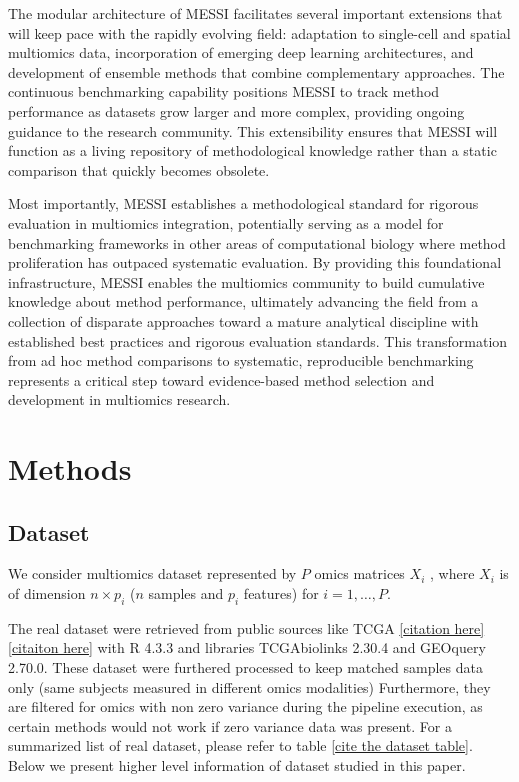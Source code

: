 \documentclass[
]{article}
\begin{document}
The modular architecture of MESSI facilitates several important extensions that will keep pace with the rapidly evolving field: adaptation to single-cell and spatial multiomics data, incorporation of emerging deep learning architectures, and development of ensemble methods that combine complementary approaches. The continuous benchmarking capability positions MESSI to track method performance as datasets grow larger and more complex, providing ongoing guidance to the research community. This extensibility ensures that MESSI will function as a living repository of methodological knowledge rather than a static comparison that quickly becomes obsolete.

Most importantly, MESSI establishes a methodological standard for rigorous evaluation in multiomics integration, potentially serving as a model for benchmarking frameworks in other areas of computational biology where method proliferation has outpaced systematic evaluation. By providing this foundational infrastructure, MESSI enables the multiomics community to build cumulative knowledge about method performance, ultimately advancing the field from a collection of disparate approaches toward a mature analytical discipline with established best practices and rigorous evaluation standards. This transformation from ad hoc method comparisons to systematic, reproducible benchmarking represents a critical step toward evidence-based method selection and development in multiomics research.

\newpage

\hypertarget{methods}{%
\section{Methods}\label{methods}}

\hypertarget{dataset}{%
\subsection{Dataset}\label{dataset}}

We consider multiomics dataset represented by \(P\) omics matrices \(X_i\) , where \(X_i\) is of dimension \(n \times p_i\) (\(n\) samples and \(p_i\) features) for \(i = 1, \dots, P\).

The real dataset were retrieved from public sources like TCGA \href{citation}{{[}citation here{]}} \href{citation}{{[}citaiton here{]}} with R 4.3.3 and libraries TCGAbiolinks 2.30.4 and GEOquery 2.70.0.
These dataset were furthered processed to keep matched samples data only (same subjects measured in different omics modalities)
Furthermore, they are filtered for omics with non zero variance during the pipeline execution, as certain methods would not work if zero variance data was present.
For a summarized list of real dataset, please refer to table \href{cite}{{[}cite the dataset table{]}}. Below we present higher level information of dataset studied in this paper.
\end{document}
